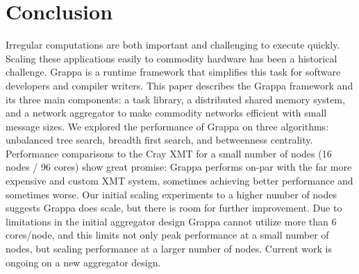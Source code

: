 \section{Conclusion}

Irregular computations are both important and challenging to execute quickly. Scaling these applications easily to commodity hardware has been a historical challenge. Grappa is a runtime framework that simplifies this task for software developers and compiler writers.  This paper describes the Grappa framework and its three main components: a task library, a distributed shared memory system, and a network aggregator to make commodity networks efficient with small message sizes.  We explored the performance of Grappa on three algorithms: unbalanced tree search, breadth first search, and betweenness centrality.  Performance comparisons to the Cray XMT for a small number of nodes (16 nodes / 96 cores) show great promise: Grappa performs on-par with the far more expensive and custom XMT system, sometimes achieving better performance and sometimes worse.  Our initial scaling experiments to a higher number of nodes suggests Grappa does scale, but there is room for further improvement.  Due to limitations in the initial aggregator design Grappa cannot utilize more than 6 cores/node, and this limits not only peak performance at a small number of nodes, but scaling performance at a larger number of nodes.  Current work is ongoing on a new aggregator design.
